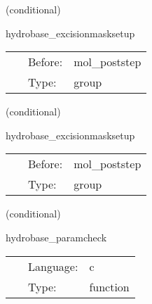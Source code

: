 \vspace{5mm}

   (conditional) 

\hspace{5mm} hydrobase\_excisionmasksetup 

\hspace{5mm}{\it set up hydro excision mask } 


\hspace{5mm}

 \begin{tabular*}{160mm}{cll} 
~ & Before:  & mol\_poststep \\ 
~ & Type:  & group \\ 
\end{tabular*} 


\vspace{5mm}

   (conditional) 

\hspace{5mm} hydrobase\_excisionmasksetup 

\hspace{5mm}{\it set up hydro excision mask } 


\hspace{5mm}

 \begin{tabular*}{160mm}{cll} 
~ & Before:  & mol\_poststep \\ 
~ & Type:  & group \\ 
\end{tabular*} 


\vspace{5mm}

   (conditional) 

\hspace{5mm} hydrobase\_paramcheck 

\hspace{5mm}{\it check that hydrobase parameters are consistent } 


\hspace{5mm}

 \begin{tabular*}{160mm}{cll} 
~ & Language:  & c \\ 
~ & Type:  & function \\ 
\end{tabular*} 


\vspace{5mm}

